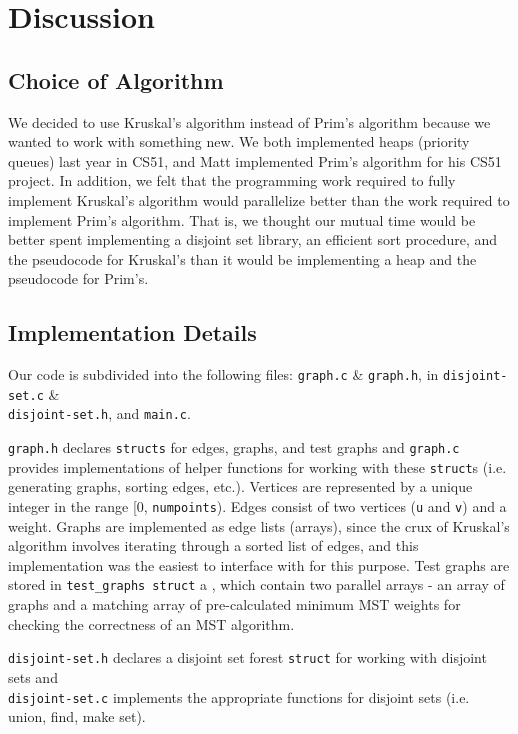 \documentclass[solution, letterpaper]{cs121}
\begin{document}
\section*{Discussion}
\subsection*{Choice of Algorithm}
We decided to use Kruskal's algorithm instead of Prim's algorithm because we wanted to work with something new. We both implemented heaps (priority queues) last year in CS51, and Matt implemented Prim's algorithm for his CS51 project. In addition, we felt that the programming work required to fully implement Kruskal's algorithm would parallelize better than the work required to implement Prim's algorithm. That is, we thought our mutual time would be better spent implementing a disjoint set library, an efficient sort procedure, and the pseudocode for Kruskal's than it would be implementing a heap and the pseudocode for Prim's.

\subsection*{Implementation Details}
Our code is subdivided into the following files: \texttt{graph.c} \& \texttt{graph.h}, in \texttt{disjoint-set.c} \& \\\texttt{disjoint-set.h}, and \texttt{main.c}.

\texttt{graph.h} declares \texttt{structs} for edges, graphs, and test graphs and \texttt{graph.c} provides implementations of helper functions for working with these \texttt{struct}s (i.e. generating graphs, sorting edges, etc.). Vertices are represented by a unique integer in the range [0, \texttt{numpoints}). Edges consist of two vertices (\texttt{u} and \texttt{v}) and a weight. Graphs are implemented as edge lists (arrays), since the crux of Kruskal's algorithm involves iterating through a sorted list of edges, and this implementation was the easiest to interface with for this purpose. Test graphs are stored in \texttt{test\_graphs struct} a , which contain two parallel arrays - an array of graphs and a matching array of pre-calculated minimum MST weights for checking the correctness of an MST algorithm.

\texttt{disjoint-set.h} declares a disjoint set forest \texttt{struct} for working with disjoint sets and\\ \texttt{disjoint-set.c} implements
the appropriate functions for disjoint sets (i.e. union, find, make set).
\end{document}

